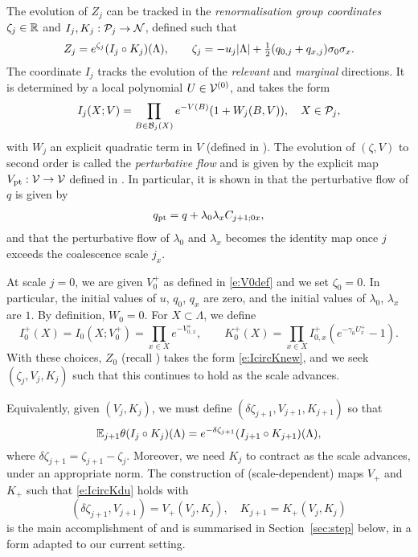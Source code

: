The evolution of $Z_j$ can be tracked in the \emph{renormalisation group coordinates}
$\zeta_j \in {\mathbb R}$ and
$I_j, K_j : \mathcal{P}_j \rightarrow \mathcal{N}$, defined such that
\begin{equation}
\label{e:IcircKnew}
	Z_j = e^{\zeta_j}(I_j\circ K_j)(\Lambda),
	\qquad
	\zeta_j= - u_j|\Lambda|
	+ \textstyle{\frac 12} (q_{0,j} + q_{x,j}) \sigma_0\sigma_x
	.
\end{equation}
The coordinate $I_j$ tracks the evolution of the
\emph{relevant} and \emph{marginal} directions.  It
is determined by a local polynomial
$U\in \mathcal{V}^{(0)}$,
and takes the form
\begin{equation}
I_j(X; V) = \prod_{B \in \mathcal{B}_j(X)} e^{-V(B)} (1 + W_j(B, V)), \quad X \in \mathcal{P}_j,
\end{equation}
with $W_j$ an explicit quadratic term in $V$ (defined in \cite[\eqref{pt-e:WLTF}]{BBS-rg-pt}).
The evolution of $(\zeta, V)$ to second order is called the \emph{perturbative flow} and is
given by the explicit map $V_{\rm pt} : \mathcal{V} \rightarrow \mathcal{V}$ defined in
\cite[\eqref{pt-e:Vptdef}]{BBS-rg-pt}.
In particular, it is shown in \cite[Proposition~\ref{phi4-prop:pt}]{ST-phi4}
that the perturbative flow of $q$ is given by
\begin{align}
\label{e:qpt}
q_{\rm pt} = q + \lambda_0 \lambda_x C_{j+1;0x},
\end{align}
and that the perturbative flow of $\lambda_0$ and $\lambda_x$ becomes the identity map
once $j$ exceeds the coalescence scale $j_x$.

At scale $j = 0$, we are given $V^+_0$ as defined in \eqref{e:V0def}
and we set $\zeta_0 = 0$. In particular,
the initial values of $u$, $q_0$, $q_x$ are zero, and the initial values of $\lambda_0$, $\lambda_x$
are $1$. By definition, $W_0 = 0$.
For $X \subset \Lambda$, we define
\begin{equation}
\label{e:IK0def}
I_0^+(X) = I_0(X; V^+_0) = \prod_{x\in X} e^{-V^+_{0,x}},
	\qquad
K_0^+(X) = \prod_{x \in X} I_{0,x}^+ (e^{-\gamma_0 U^{+}_{x}} - 1).
\end{equation}
With these choices, $Z_0$ (recall )
takes the form \eqref{e:IcircKnew}, and we seek $(\zeta_j, V_j, K_j)$ such that
this continues to hold as the scale advances.

Equivalently, given $(V_j, K_j)$, we must define $(\delta\zeta_{j+1}, V_{j+1}, K_{j+1})$ so that
\begin{equation} \label{e:IcircKdu}
	\mathbb{E}_{j+1}\theta(I_j \circ K_j)(\Lambda)
	=
	e^{-\delta \zeta_{j+1}}(I_{j+1} \circ K_{j+1})(\Lambda),
\end{equation}
where $\delta\zeta_{j+1} = \zeta_{j+1} - \zeta_j$.
Moreover, we need $K_j$ to contract as the scale advances, under an appropriate norm.
The construction of (scale-dependent) maps $V_+$ and $K_+$ such that
\eqref{e:IcircKdu} holds with
\begin{equation}
(\delta\zeta_{j+1}, V_{j+1}) = V_+(V_j, K_j),
	\quad
K_{j+1} =  K_+(V_j, K_j)
\end{equation}
is the main accomplishment of \cite{BS-rg-step} and is summarised in Section~\ref{sec:step}
below, in a form adapted to our current setting.

